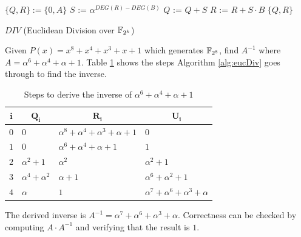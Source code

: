 \begin{algorithm}[hbt]
\SetAlgoNoLine

        $\{Q, R\} := \{0,A\}$\;
        {
                $S$ := $\alpha^{DEG(R)-DEG(B)}$\;
                $Q$ := $Q + S$\;
                $R$ := $R + S\cdot B$\;
        }
        \Return $\{Q,R\}$\;
\caption{$DIV$ (Euclidean Division over ${\mathbb{F}}_{2^k}$)}\label{alg:eucDiv}
\end{algorithm}

\begin{Example}
Given $P(x)=x^8+x^4+x^3+x+1$ which generates ${\mathbb{F}}_{2^8}$, find $A^{-1}$ where
$A=\alpha^6+\alpha^4+\alpha+1$. Table \ref{tab:divExTab} shows the steps 
Algorithm \ref{alg:eucDiv} goes through to find the inverse.

\begin{table}[h]
\begin{center}
\caption{Steps to derive the inverse of $\alpha^6+\alpha^4+\alpha+1$ }
\label{tab:divExTab}
\begin{tabular}{|c|l|l|l|} 
\hline
$\mathbf{i}$ & \multicolumn{1}{c|}{$\mathbf{Q_i}$} & \multicolumn{1}{c|}{$\mathbf{R_i}$} & \multicolumn{1}{c|}{$\mathbf{U_i}$} \\
\hline
$0$ & $0$                 & $\alpha^8+\alpha^4+\alpha^3+\alpha+1$ & $0$                                 \\
\hline
$1$ & $0$                 & $\alpha^6+\alpha^4+\alpha+1$          & $1$                                 \\
\hline
$2$ & $\alpha^2+1$        & $\alpha^2$                            & $\alpha^2+1$                        \\
\hline
$3$ & $\alpha^4+\alpha^2$ & $\alpha+1$                            & $\alpha^6+\alpha^2+1$               \\
\hline
$4$ & $\alpha$            & $1$                                   & $\alpha^7+\alpha^6+\alpha^3+\alpha$ \\
\hline
\end{tabular}
\end{center}
\end{table}

The derived inverse is $A^{-1}=\alpha^7+\alpha^6+\alpha^3+\alpha$. Correctness
can be checked by computing $A \cdot A^{-1}$ and verifying that the result is $1$.
\end{Example}

